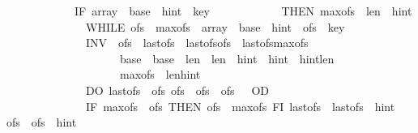 \begin{isabellebody}
\ \ \ \ \ \ \ \ \ \ \ \ IF\ {\isasymacute}array\ {\isacharbang}\ {\isacharparenleft}{\isasymacute}base\ {\isacharplus}\ {\isasymacute}hint{\isacharparenright}\ {\isacharless}\ {\isasymacute}key\isanewline
\ \ \ \ \ \ \ \ \ \ \ \ THEN\ {\isasymacute}max{\isacharunderscore}ofs\ {\isacharcolon}{\isacharequal}{\isacharequal}\ {\isasymacute}len\ {\isacharminus}\ {\isasymacute}hint{\isacharsemicolon}{\isacharsemicolon}\isanewline
\ \ \ \ \ \ \ \ \ \ \ \ \ \ WHILE\ {\isasymacute}ofs\ {\isacharless}\ {\isasymacute}max{\isacharunderscore}ofs\ {\isasymand}\ {\isasymacute}array\ {\isacharbang}\ {\isacharparenleft}{\isasymacute}base\ {\isacharplus}\ {\isasymacute}hint\ {\isacharplus}\ {\isasymacute}ofs{\isacharparenright}\ {\isacharless}\ {\isasymacute}key\ \isanewline
\ \ \ \ \ \ \ \ \ \ \ \ \ \ INV\ {\isasymlbrace}\ {\isasymacute}ofs{\isachargreater}{}\ {\isasymand}\ {\isasymacute}last{\isacharunderscore}ofs{\isasymge}{}\ {\isasymand}\ {\isasymacute}last{\isacharunderscore}ofs{\isacharless}{\isasymacute}ofs\ {\isasymand}\ {\isasymacute}last{\isacharunderscore}ofs{\isacharless}{\isasymacute}max{\isacharunderscore}ofs\ {\isasymand}\isanewline
\ \ \ \ \ \ \ \ \ \ \ \ \ \ \ \ \ \ \ \ {\isasymacute}base\ {\isacharequal}\ \isactrlbsup {\isasymsigma}\isactrlesup base\ {\isasymand}\ {\isasymacute}len\ {\isacharequal}\ \isactrlbsup {\isasymsigma}\isactrlesup len\ {\isasymand}\ {\isasymacute}hint\ {\isacharequal}\ \isactrlbsup {\isasymsigma}\isactrlesup hint\ {\isasymand}\ {\isasymacute}hint{\isacharless}{\isasymacute}len\ {\isasymand}\isanewline
\ \ \ \ \ \ \ \ \ \ \ \ \ \ \ \ \ \ \ \ {\isasymacute}max{\isacharunderscore}ofs\ {\isacharequal}\ {\isasymacute}len{\isacharminus}{\isasymacute}hint\ {\isasymrbrace}\isanewline
\ \ \ \ \ \ \ \ \ \ \ \ \ \ DO\ {\isasymacute}last{\isacharunderscore}ofs\ {\isacharcolon}{\isacharequal}{\isacharequal}\ {\isasymacute}ofs{\isacharsemicolon}{\isacharsemicolon}\ {\isasymacute}ofs\ {\isacharcolon}{\isacharequal}{\isacharequal}\ {\isasymacute}ofs\ {\isacharplus}\ {\isasymacute}ofs\ {\isacharplus}\ {}\ OD{\isacharsemicolon}{\isacharsemicolon}\isanewline
\ \ \ \ \ \ \ \ \ \ \ \ \ \ IF\ {\isasymacute}max{\isacharunderscore}ofs\ {\isacharless}\ {\isasymacute}ofs\ THEN\ {\isasymacute}ofs\ {\isacharcolon}{\isacharequal}{\isacharequal}\ {\isasymacute}max{\isacharunderscore}ofs\ FI{\isacharsemicolon}{\isacharsemicolon}\ {\isasymacute}last{\isacharunderscore}ofs\ {\isacharcolon}{\isacharequal}{\isacharequal}\ {\isasymacute}last{\isacharunderscore}ofs\ {\isacharplus}\ {\isasymacute}hint\ {\isacharplus}\ {}{\isacharsemicolon}{\isacharsemicolon}\ {\isasymacute}ofs\ {\isacharcolon}{\isacharequal}{\isacharequal}\ {\isasymacute}ofs\ {\isacharplus}\ {\isasymacute}hint\isanewline

\end{isabellebody}
